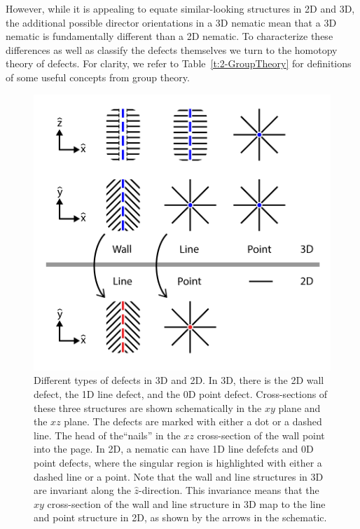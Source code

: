 However, while it is appealing to equate similar-looking structures in 2D and 3D, the additional possible director orientations in a 3D nematic mean that a 3D nematic is fundamentally different than a 2D nematic.
To characterize these differences as well as classify the defects themselves we turn to the homotopy theory of defects.
For clarity, we refer to Table~\ref{t:2-GroupTheory} for definitions of some useful concepts from group theory.\\

\begin{figure}[h]
  \centering
  \includegraphics{figures/C2/Ch2-Figs_GenDef.png}
  \caption{Different types of defects in 3D and 2D.
  In 3D, there is the 2D wall defect, the 1D line defect, and the 0D point defect.
  Cross-sections of these three structures are shown schematically in the $xy$ plane and the $xz$ plane.
  The defects are marked with either a dot or a dashed line.
  The head of the``nails'' in the $xz$ cross-section of the wall point into the page.
  In 2D, a nematic can have 1D line defefcts and 0D point defects, where the singular region is highlighted with either a dashed line or a point.
  Note that the wall and line structures in 3D are invariant along the $\hat{z}$-direction.
  This invariance means that the $xy$ cross-section of the wall and line structure in 3D map to the line and point structure in 2D, as shown by the arrows in the schematic.}\label{f:2-GenDef}
\end{figure}

